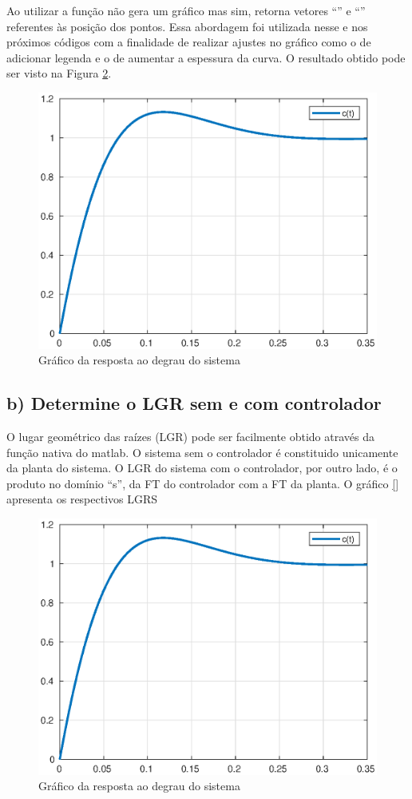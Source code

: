         Ao utilizar  a função  não gera um gráfico
        mas sim, retorna vetores ``'' e ``'' referentes às posição dos pontos. Essa abordagem foi utilizada  
        nesse e nos próximos códigos com a finalidade de realizar ajustes no gráfico como o de adicionar legenda e o de aumentar 
        a espessura da curva. O resultado obtido pode ser visto na Figura \ref{fig1a}.

        \begin{figure}[!h]
            \centering
            \includegraphics[width = 0.75\linewidth]{Figuras/ProblemaPID/step.eps}
            \caption{Gráfico da resposta ao degrau do sistema}
            \label{fig1a}        
        \end{figure}

    \subsection*{b) Determine o LGR  sem e com controlador}
        O lugar geométrico das raízes (LGR) pode ser facilmente obtido através da função  nativa do matlab. 
        O sistema sem o controlador é constituido unicamente da planta do sistema. O LGR do sistema com o controlador, por outro 
        lado, é o produto no domínio ``s'', da FT do controlador com a FT da planta. O gráfico \ref{} apresenta os respectivos 
        LGRS 
        
        \begin{figure}[!h]
            \centering
            \includegraphics[width = 0.75\linewidth]{Figuras/ProblemaPID/step.eps}
            \caption{Gráfico da resposta ao degrau do sistema}
            \label{fig1a}        
        \end{figure}